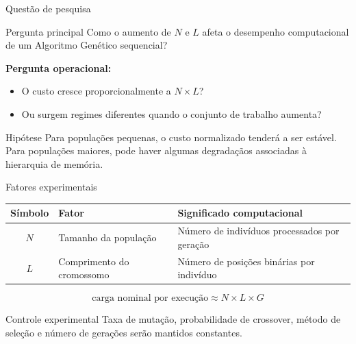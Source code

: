 \documentclass[aspectratio=169,11pt]{beamer}
\begin{document}
\begin{frame}{Questão de pesquisa}

    \vspace{0.15cm}

    \begin{questionbox}{Pergunta principal}
        Como o aumento de $N$ e $L$ afeta o desempenho computacional
        de um Algoritmo Genético sequencial?
    \end{questionbox}

    \vspace{0.28cm}

    \textbf{Pergunta operacional:}

    \begin{itemize}
        \item O custo cresce proporcionalmente a $N \times L$?
        \item Ou surgem regimes diferentes quando o conjunto de trabalho aumenta?
    \end{itemize}

    \vspace{0.12cm}

    \begin{impactbox}{Hipótese}
        Para populações pequenas, o custo normalizado tenderá a ser estável.
        Para populações maiores, pode haver algumas degradaçãos associadas à hierarquia
        de memória.
    \end{impactbox}

\end{frame}


\begin{frame}{Fatores experimentais}

    \vspace{0.08cm}

    \renewcommand{\arraystretch}{1.30}
    \begin{tabularx}{\textwidth}{>{\bfseries}c X X}
        Símbolo & Fator & Significado computacional \\
        \hline
        $N$ & Tamanho da população & Número de indivíduos processados por geração \\
        $L$ & Comprimento do cromossomo & Número de posições binárias por indivíduo \\
    \end{tabularx}

    \vspace{0.28cm}

    \[
        \text{carga nominal por execução} \approx N \times L \times G
    \]

    \vspace{0.10cm}

    \begin{questionbox}{Controle experimental}
        Taxa de mutação, probabilidade de crossover, método de seleção
        e número de gerações serão mantidos constantes.
    \end{questionbox}

\end{frame}
\end{document}
